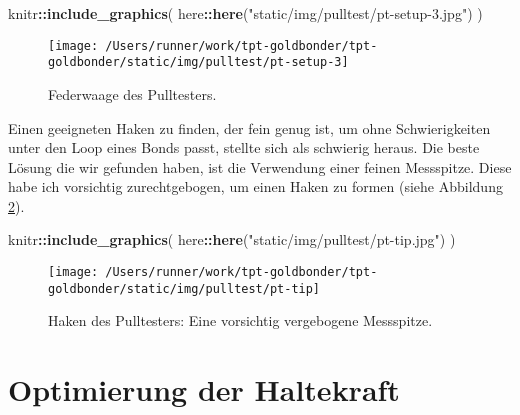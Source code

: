 \documentclass[
  paper=a4,
  ,captions=tableheading
]{scrartcl}
\newenvironment{Shaded}{\begin{snugshade}}{\end{snugshade}}
\newcommand{\KeywordTok}[1]{\textcolor[rgb]{0.13,0.29,0.53}{\textbf{#1}}}
\newcommand{\NormalTok}[1]{#1}
\newcommand{\OperatorTok}[1]{\textcolor[rgb]{0.81,0.36,0.00}{\textbf{#1}}}
\newcommand{\StringTok}[1]{\textcolor[rgb]{0.31,0.60,0.02}{#1}}
\begin{document}
\begin{Shaded}
\begin{Highlighting}[]
\NormalTok{knitr}\OperatorTok{::}\KeywordTok{include_graphics}\NormalTok{(}
\NormalTok{  here}\OperatorTok{::}\KeywordTok{here}\NormalTok{(}\StringTok{"static/img/pulltest/pt-setup-3.jpg"}\NormalTok{)}
\NormalTok{)}
\end{Highlighting}
\end{Shaded}

\begin{figure}

{\centering \texttt{[image: /Users/runner/work/tpt-goldbonder/tpt-goldbonder/static/img/pulltest/pt-setup-3]} 

}

\caption{Federwaage des Pulltesters. }\label{fig:pt-setup-3}
\end{figure}

Einen geeigneten Haken zu finden, der fein genug ist, um ohne Schwierigkeiten unter den Loop eines Bonds passt, stellte sich als schwierig heraus. Die beste Lösung die wir gefunden haben, ist die Verwendung einer feinen Messspitze. Diese habe ich vorsichtig zurechtgebogen, um einen Haken zu formen (siehe Abbildung \ref{fig:pulltester-tip}).

\begin{Shaded}
\begin{Highlighting}[]
\NormalTok{knitr}\OperatorTok{::}\KeywordTok{include_graphics}\NormalTok{(}
\NormalTok{  here}\OperatorTok{::}\KeywordTok{here}\NormalTok{(}\StringTok{"static/img/pulltest/pt-tip.jpg"}\NormalTok{)}
\NormalTok{)}
\end{Highlighting}
\end{Shaded}

\begin{figure}

{\centering \texttt{[image: /Users/runner/work/tpt-goldbonder/tpt-goldbonder/static/img/pulltest/pt-tip]} 

}

\caption{Haken des Pulltesters: Eine vorsichtig vergebogene Messspitze.}\label{fig:pulltester-tip}
\end{figure}

\hypertarget{pt-optimal}{%
\section{Optimierung der Haltekraft}\label{pt-optimal}}
\end{document}
